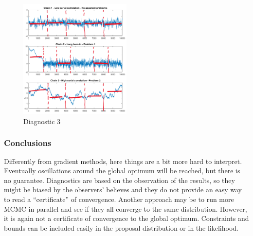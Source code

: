     \begin{figure}
      \centering
      \includegraphics[width=0.5\textwidth]{diag_3.png}
      \caption{Diagnostic 3}
      \label{fig:dia-3}
    \end{figure}

    \subsubsection{Conclusions}
    Differently from gradient methods, here things are a bit more hard to interpret.
    Eventually oscillations around the global optimum will be reached, but there is no guarantee.
    Diagnostics are based on the observation of the results, so they might
    be biased by the observers' believes and they do not provide an easy way to read a ``certificate'' of convergence.
    Another approach may be to run more MCMC in parallel and see if they all converge to the same distribution.
    However, it is again not a certificate of convergence to the global optimum.
    Constraints and bounds can be included easily in the proposal distribution or in the likelihood.

